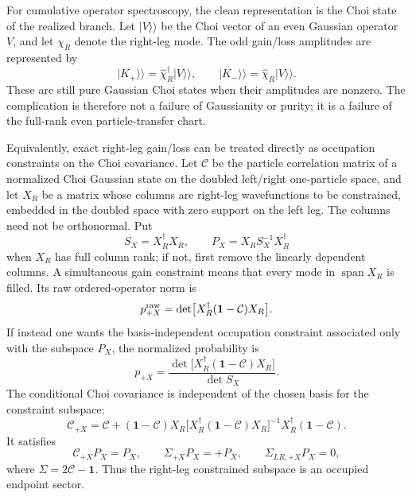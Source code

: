 \documentclass[aps,prb,onecolumn,nofootinbib,superscriptaddress]{revtex4-2}
\newcommand{\I}{\mathbf{1}}
\newcommand{\ket}[1]{\lvert #1\rangle}
\theoremstyle{plain}
\theoremstyle{definition}
\begin{document}
For cumulative operator spectroscopy, the clean representation is the Choi
state of the realized branch.  Let \(\ket{V}\!\rangle\) be the Choi vector of
an even Gaussian operator \(V\), and let \(\chi_R\) denote the right-leg mode.
The odd gain/loss amplitudes are represented by
\begin{equation}
  \ket{K_+}\!\rangle=\hat\chi_R^\dagger\ket{V}\!\rangle,
  \qquad
  \ket{K_-}\!\rangle=\hat\chi_R\ket{V}\!\rangle .
  \label{eq:odd-choi-branches}
\end{equation}
These are still pure Gaussian Choi states when their amplitudes are nonzero.
The complication is therefore not a failure of Gaussianity or purity; it is a
failure of the full-rank even particle-transfer chart.

Equivalently, exact right-leg gain/loss can be treated directly as occupation
constraints on the Choi covariance.  Let \(\mathcal C\) be the particle
correlation matrix of a normalized Choi Gaussian state on the doubled
left/right one-particle space, and let \(X_R\) be a matrix whose columns are
right-leg wavefunctions to be constrained, embedded in the doubled space with
zero support on the left leg.  The columns need not be orthonormal.  Put
\begin{equation}
  S_X=X_R^\dagger X_R,
  \qquad
  P_X=X_R S_X^{-1}X_R^\dagger
  \label{eq:choi-nonorthogonal-projector}
\end{equation}
when \(X_R\) has full column rank; if not, first remove the linearly dependent
columns.  A simultaneous gain constraint means that every mode in
\(\operatorname{span}X_R\) is filled.  Its raw ordered-operator norm is
\begin{equation}
  p^{\rm raw}_{+X}
  =
  \det\!\big[X_R^\dagger(\I-\mathcal C)X_R\big] .
  \label{eq:choi-gain-raw-gram}
\end{equation}
If instead one wants the basis-independent occupation constraint associated
only with the subspace \(P_X\), the normalized probability is
\begin{equation}
  p_{+X}
  =
  \frac{\det\!\big[X_R^\dagger(\I-\mathcal C)X_R\big]}{\det S_X} .
  \label{eq:choi-gain-normalized-gram}
\end{equation}
The conditional Choi covariance is independent of the chosen basis for the
constraint subspace:
\begin{equation}
  \mathcal C_{+X}
  =
  \mathcal C
  +
  (\I-\mathcal C)X_R
  \big[X_R^\dagger(\I-\mathcal C)X_R\big]^{-1}
  X_R^\dagger(\I-\mathcal C) .
  \label{eq:choi-gain-constraint-update}
\end{equation}
It satisfies
\begin{equation}
  \mathcal C_{+X}P_X=P_X,
  \qquad
  \Sigma_{+X}P_X=+P_X,
  \qquad
  \Sigma_{LR,+X}P_X=0,
  \label{eq:choi-gain-endpoint-constraint}
\end{equation}
where \(\Sigma=2\mathcal C-\I\).  Thus the right-leg constrained subspace is
an occupied endpoint sector.
\end{document}
